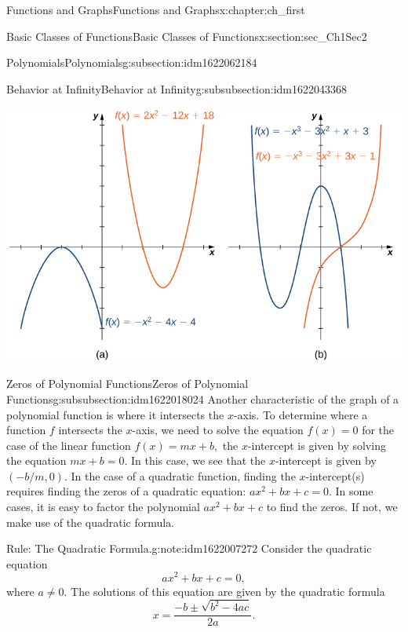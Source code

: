 \documentclass[oneside,10pt,]{book}
\numberwithin{equation}{section}
\begin{document}
\begin{chapterptx}{Functions and Graphs}{}{Functions and Graphs}{}{}{x:chapter:ch_first}
\begin{sectionptx}{Basic Classes of Functions}{}{Basic Classes of Functions}{}{}{x:section:sec_Ch1Sec2}
\begin{subsectionptx}{Polynomials}{}{Polynomials}{}{}{g:subsection:idm1622062184}
\begin{subsubsectionptx}{Behavior at Infinity}{}{Behavior at Infinity}{}{}{g:subsubsection:idm1622043368}
\begin{figureptx}
\begin{image}{0.25}{0.5}{0.25}
\includegraphics[width=\linewidth]{external/CNX_Calc_Figure_01_02_005.jpg}
\end{image}%
\tcblower
\end{figureptx}%
\end{subsubsectionptx}
%
%
\typeout{************************************************}
\typeout{************************************************}
%
\begin{subsubsectionptx}{Zeros of Polynomial Functions}{}{Zeros of Polynomial Functions}{}{}{g:subsubsection:idm1622018024}
Another characteristic of the graph of a polynomial function is where it intersects the \(x\)-axis. To determine where a function \(f\) intersects the \(x\)-axis, we need to solve the equation \(f(x)= 0 \) for the case of the linear function \(f(x)=mx+b,\) the \(x\)-intercept is given by solving the equation \(mx+b= 0 .\) In this case, we see that the \(x\)-intercept is given by \((-b/m, 0 ).\) In the case of a quadratic function, finding the \(x\)-intercept(s) requires finding the zeros of a quadratic equation: \(ax^2 +bx+c= 0 .\) In some cases, it is easy to factor the polynomial \(ax^2+bx+c\) to find the zeros. If not, we make use of the quadratic formula.%
\begin{note}{Rule: The Quadratic Formula.}{g:note:idm1622007272}%
Consider the quadratic equation%
%
\begin{equation*}
ax^2 +bx+c= 0 ,
\end{equation*}
where \(a\neq  0 .\) The solutions of this equation are given by the quadratic formula%
%
\begin{equation*}
x=\frac{-b\pm \sqrt{b^2- 4 ac}}{ 2 a}.
\end{equation*}

\end{note}
\end{subsubsectionptx}
\end{subsectionptx}
\end{sectionptx}
\end{chapterptx}
\end{document}
